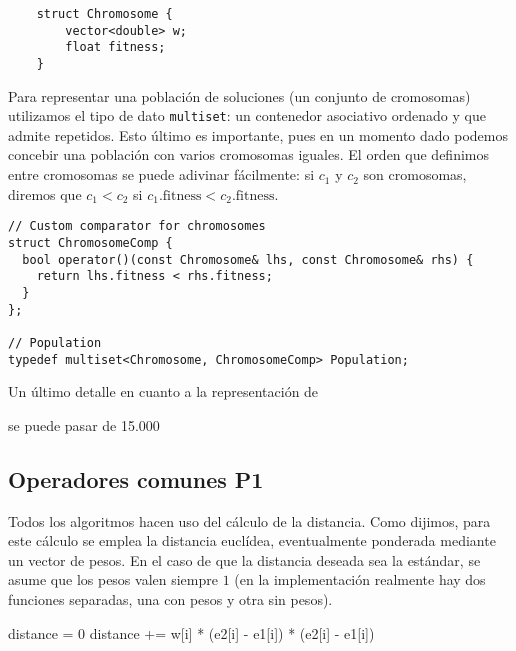 \documentclass[12pt]{article}
\begin{document}
\begin{verbatim}
	struct Chromosome {
	    vector<double> w;
	    float fitness;
	}
\end{verbatim}

Para representar una población de soluciones (un conjunto de cromosomas) utilizamos el tipo de dato \verb|multiset|: un contenedor asociativo ordenado y que admite repetidos. Esto último es importante, pues en un momento dado podemos concebir una población con varios cromosomas iguales. El orden que definimos entre cromosomas se puede adivinar fácilmente: si $c_1$ y $c_2$ son cromosomas, diremos que $c_1 < c_2$ si $c_1.\text{fitness} < c_2.\text{fitness}$.

\begin{verbatim}
// Custom comparator for chromosomes
struct ChromosomeComp {
  bool operator()(const Chromosome& lhs, const Chromosome& rhs) {
    return lhs.fitness < rhs.fitness;
  }
};

// Population
typedef multiset<Chromosome, ChromosomeComp> Population;
\end{verbatim}

Un último detalle en cuanto a la representación de 

se puede pasar de 15.000




\subsection*{{\color{red}Operadores comunes P1}}

Todos los algoritmos hacen uso del cálculo de la distancia. Como dijimos, para este cálculo se emplea la distancia euclídea, eventualmente ponderada mediante un vector de pesos. En el caso de que la distancia deseada sea la estándar, se asume que los pesos valen siempre $1$ (en la implementación realmente hay dos funciones separadas, una con pesos y otra sin pesos).\\

\newpage 

\begin{algorithm}[h]
\begin{algorithmic}

     \State distance = $0$
       
            \State distance += w[i] * (e2[i] - e1[i]) * (e2[i] - e1[i])
         \EndIf
     \EndFor
\EndFunction

\end{algorithmic}
\end{algorithm}
\end{document}

